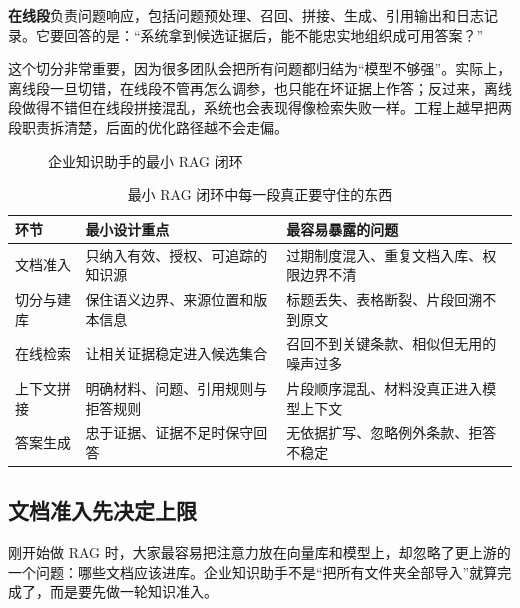 \textbf{在线段}负责问题响应，包括问题预处理、召回、拼接、生成、引用输出和日志记录。它要回答的是：“系统拿到候选证据后，能不能忠实地组织成可用答案？”

这个切分非常重要，因为很多团队会把所有问题都归结为“模型不够强”。实际上，离线段一旦切错，在线段不管再怎么调参，也只能在坏证据上作答；反过来，离线段做得不错但在线段拼接混乱，系统也会表现得像检索失败一样。工程上越早把两段职责拆清楚，后面的优化路径越不会走偏。

\begin{figure}[H]
\centering
{}
\caption{企业知识助手的最小 RAG 闭环}
\label{fig:minimal-rag-loop}
\end{figure}

\begin{table}[H]
\centering
\small
\begin{tabularx}{\textwidth}{>{\raggedright\arraybackslash}p{2.8cm}>{\raggedright\arraybackslash}p{3.2cm}>{\raggedright\arraybackslash}X}
\toprule
\textbf{环节} & \textbf{最小设计重点} & \textbf{最容易暴露的问题} \\
\midrule
文档准入 & 只纳入有效、授权、可追踪的知识源 & 过期制度混入、重复文档入库、权限边界不清 \\
切分与建库 & 保住语义边界、来源位置和版本信息 & 标题丢失、表格断裂、片段回溯不到原文 \\
在线检索 & 让相关证据稳定进入候选集合 & 召回不到关键条款、相似但无用的噪声过多 \\
上下文拼接 & 明确材料、问题、引用规则与拒答规则 & 片段顺序混乱、材料没真正进入模型上下文 \\
答案生成 & 忠于证据、证据不足时保守回答 & 无依据扩写、忽略例外条款、拒答不稳定 \\
\bottomrule
\end{tabularx}
\caption{最小 RAG 闭环中每一段真正要守住的东西}
\label{tab:rag-min-loop}
\end{table}

\subsection{文档准入先决定上限}
刚开始做 RAG 时，大家最容易把注意力放在向量库和模型上，却忽略了更上游的一个问题：哪些文档应该进库。企业知识助手不是“把所有文件夹全部导入”就算完成了，而是要先做一轮知识准入。

